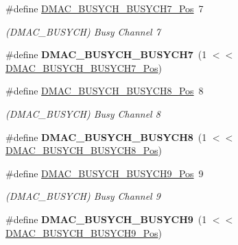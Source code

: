 \begin{DoxyCompactItemize}
\item 
\hypertarget{group___s_a_m_l21___d_m_a_c_ga2132afbe7bd19ce963c029ace062297b}{}\#define \hyperlink{group___s_a_m_l21___d_m_a_c_ga2132afbe7bd19ce963c029ace062297b}{D\+M\+A\+C\+\_\+\+B\+U\+S\+Y\+C\+H\+\_\+\+B\+U\+S\+Y\+C\+H7\+\_\+\+Pos}~7\label{group___s_a_m_l21___d_m_a_c_ga2132afbe7bd19ce963c029ace062297b}

\begin{DoxyCompactList}\small\item\em (D\+M\+A\+C\+\_\+\+B\+U\+S\+Y\+C\+H) Busy Channel 7 \end{DoxyCompactList}\item 
\hypertarget{group___s_a_m_l21___d_m_a_c_gaecdf84d88da3aba3f5533f57af2ae7c0}{}\#define {\bfseries D\+M\+A\+C\+\_\+\+B\+U\+S\+Y\+C\+H\+\_\+\+B\+U\+S\+Y\+C\+H7}~(1 $<$$<$ \hyperlink{group___s_a_m_l21___d_m_a_c_ga2132afbe7bd19ce963c029ace062297b}{D\+M\+A\+C\+\_\+\+B\+U\+S\+Y\+C\+H\+\_\+\+B\+U\+S\+Y\+C\+H7\+\_\+\+Pos})\label{group___s_a_m_l21___d_m_a_c_gaecdf84d88da3aba3f5533f57af2ae7c0}

\item 
\hypertarget{group___s_a_m_l21___d_m_a_c_ga4721f748c024ab2e5810bd3ddcf22c59}{}\#define \hyperlink{group___s_a_m_l21___d_m_a_c_ga4721f748c024ab2e5810bd3ddcf22c59}{D\+M\+A\+C\+\_\+\+B\+U\+S\+Y\+C\+H\+\_\+\+B\+U\+S\+Y\+C\+H8\+\_\+\+Pos}~8\label{group___s_a_m_l21___d_m_a_c_ga4721f748c024ab2e5810bd3ddcf22c59}

\begin{DoxyCompactList}\small\item\em (D\+M\+A\+C\+\_\+\+B\+U\+S\+Y\+C\+H) Busy Channel 8 \end{DoxyCompactList}\item 
\hypertarget{group___s_a_m_l21___d_m_a_c_gacb3cef5966afc9aaa99c01a1f9add7f7}{}\#define {\bfseries D\+M\+A\+C\+\_\+\+B\+U\+S\+Y\+C\+H\+\_\+\+B\+U\+S\+Y\+C\+H8}~(1 $<$$<$ \hyperlink{group___s_a_m_l21___d_m_a_c_ga4721f748c024ab2e5810bd3ddcf22c59}{D\+M\+A\+C\+\_\+\+B\+U\+S\+Y\+C\+H\+\_\+\+B\+U\+S\+Y\+C\+H8\+\_\+\+Pos})\label{group___s_a_m_l21___d_m_a_c_gacb3cef5966afc9aaa99c01a1f9add7f7}

\item 
\hypertarget{group___s_a_m_l21___d_m_a_c_gafa62bfb0cc965c62f93a0bcdea902d82}{}\#define \hyperlink{group___s_a_m_l21___d_m_a_c_gafa62bfb0cc965c62f93a0bcdea902d82}{D\+M\+A\+C\+\_\+\+B\+U\+S\+Y\+C\+H\+\_\+\+B\+U\+S\+Y\+C\+H9\+\_\+\+Pos}~9\label{group___s_a_m_l21___d_m_a_c_gafa62bfb0cc965c62f93a0bcdea902d82}

\begin{DoxyCompactList}\small\item\em (D\+M\+A\+C\+\_\+\+B\+U\+S\+Y\+C\+H) Busy Channel 9 \end{DoxyCompactList}\item 
\hypertarget{group___s_a_m_l21___d_m_a_c_gacd5881c210886405a8126d9898d7440c}{}\#define {\bfseries D\+M\+A\+C\+\_\+\+B\+U\+S\+Y\+C\+H\+\_\+\+B\+U\+S\+Y\+C\+H9}~(1 $<$$<$ \hyperlink{group___s_a_m_l21___d_m_a_c_gafa62bfb0cc965c62f93a0bcdea902d82}{D\+M\+A\+C\+\_\+\+B\+U\+S\+Y\+C\+H\+\_\+\+B\+U\+S\+Y\+C\+H9\+\_\+\+Pos})\label{group___s_a_m_l21___d_m_a_c_gacd5881c210886405a8126d9898d7440c}


\end{DoxyCompactItemize}

